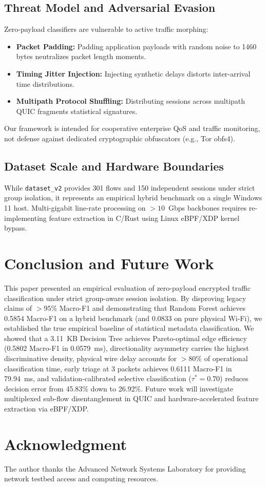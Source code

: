 \documentclass[conference]{IEEEtran}
\begin{document}
\subsection{Threat Model and Adversarial Evasion}
Zero-payload classifiers are vulnerable to active traffic morphing:
\begin{itemize}
    \item \textbf{Packet Padding:} Padding application payloads with random noise to 1460 bytes neutralizes packet length moments.
    \item \textbf{Timing Jitter Injection:} Injecting synthetic delays distorts inter-arrival time distributions.
    \item \textbf{Multipath Protocol Shuffling:} Distributing sessions across multipath QUIC fragments statistical signatures.
\end{itemize}
Our framework is intended for cooperative enterprise QoS and traffic monitoring, not defense against dedicated cryptographic obfuscators (e.g., Tor obfs4).

\subsection{Dataset Scale and Hardware Boundaries}
While \texttt{dataset\_v2} provides 301 flows and 150 independent sessions under strict group isolation, it represents an empirical hybrid benchmark on a single Windows 11 host. Multi-gigabit line-rate processing on $>10$~Gbps backbones requires re-implementing feature extraction in C/Rust using Linux eBPF/XDP kernel bypass.

\section{Conclusion and Future Work}
\label{sec:conclusion}

This paper presented an empirical evaluation of zero-payload encrypted traffic classification under strict group-aware session isolation. By disproving legacy claims of $>95\%$ Macro-F1 and demonstrating that Random Forest achieves 0.5854 Macro-F1 on a hybrid benchmark (and 0.0833 on pure physical Wi-Fi), we established the true empirical baseline of statistical metadata classification. We showed that a 3.11~KB Decision Tree achieves Pareto-optimal edge efficiency (0.5802 Macro-F1 in 0.0579~ms), directionality asymmetry carries the highest discriminative density, physical wire delay accounts for $>80\%$ of operational classification time, early triage at 3 packets achieves 0.6111 Macro-F1 in 79.94~ms, and validation-calibrated selective classification ($\tau^* = 0.70$) reduces decision error from 45.83\% down to 26.92\%. Future work will investigate multiplexed sub-flow disentanglement in QUIC and hardware-accelerated feature extraction via eBPF/XDP.

\section*{Acknowledgment}
The author thanks the Advanced Network Systems Laboratory for providing network testbed access and computing resources.



\end{document}
